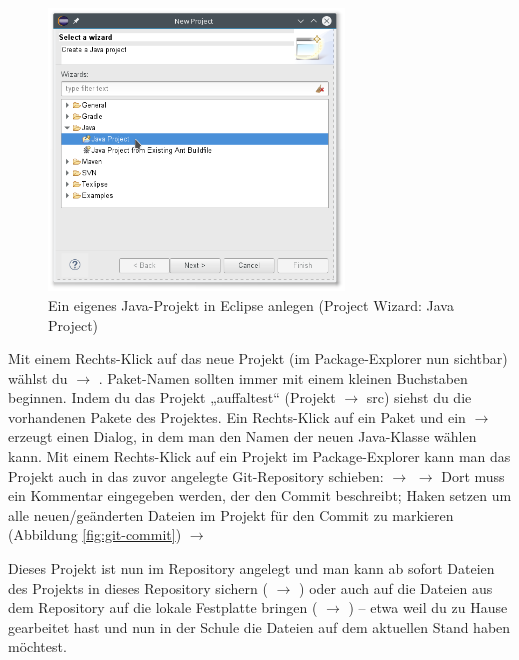 \begin{figure}[h]
  \centering
   \includegraphics[width=0.70\textwidth]{./inf/SEKII/01_Vorbereitung/Import_Project_from_Git_using_Project_Wizard_2.png}
   \caption{Ein eigenes Java-Projekt in Eclipse anlegen (Project Wizard: Java Project)}
   \label{fig:import-project-from-git-using-wizard-2}
\end{figure}

\afterpage{\clearpage}

Mit einem Rechts-Klick auf das neue Projekt (im Package-Explorer nun sichtbar)
wählst du  $\rightarrow$ . Paket-Namen sollten immer
mit einem kleinen Buchstaben beginnen. Indem du das Projekt „auffaltest“
(Projekt $\rightarrow$ src) siehst du die vorhandenen Pakete des Projektes. Ein
Rechts-Klick auf ein Paket und ein  $\rightarrow$ 
erzeugt einen Dialog, in dem man den Namen der neuen Java-Klasse wählen kann.
Mit einem Rechts-Klick auf ein Projekt im Package-Explorer kann man das Projekt
auch in das zuvor angelegte Git-Repository schieben: 
$\rightarrow$  $\rightarrow$ Dort muss ein Kommentar
eingegeben werden, der den Commit beschreibt; Haken setzen um alle
neuen/geänderten Dateien im Projekt für den Commit zu markieren (Abbildung
\ref{fig:git-commit}) $\rightarrow$ 

Dieses Projekt ist nun im Repository angelegt und man kann ab sofort Dateien des
Projekts in dieses Repository sichern ( $\rightarrow$
) oder auch auf die Dateien aus dem Repository auf die
lokale Festplatte bringen ( $\rightarrow$ )
-- etwa weil du zu Hause gearbeitet hast und nun in der Schule die Dateien auf
dem aktuellen Stand haben möchtest.


